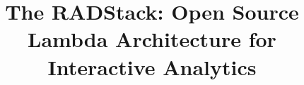 \documentclass{vldb}
\begin{document}

\title{The RADStack: Open Source Lambda Architecture for Interactive Analytics}



%
%
%
%

\end{document}
